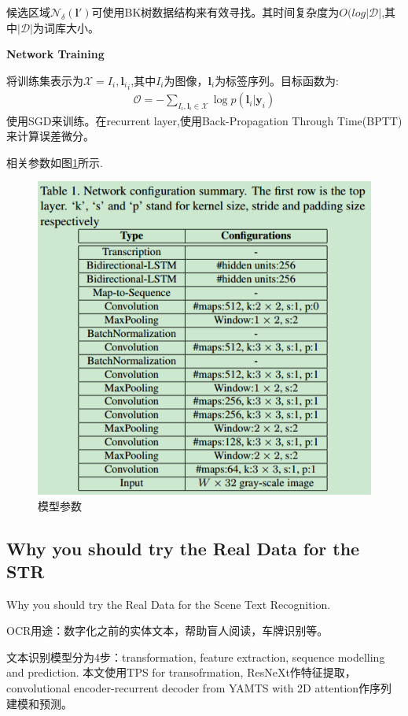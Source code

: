 \documentclass{article}
\begin{document}
候选区域$\mathcal{N}_\delta(\textbf{l}')$可使用BK树数据结构来有效寻找。其时间复杂度为$O(log|\mathcal{D}|$,其中$|\mathcal{D}|$为词库大小。

\textbf{Network Training}

将训练集表示为$\mathcal{X}={I_i,\textbf{l}_i}_i$,其中$I_i$为图像，$\textbf{l}_i$为标签序列。目标函数为:
\begin{align}
\mathcal{O} = - \sum_{I_i,\textbf{l}_i \in \mathcal{X}} \log p(\textbf{l}_i| \textbf{y}_i)
\end{align}
使用SGD来训练。在recurrent layer,使用Back-Propagation Through Time(BPTT)来计算误差微分。

相关参数如图\ref{Fig.crnn_table}所示.
\begin{figure}
\centering
\includegraphics[scale=0.5]{images/CRNN/crnn_table.png}
\caption{模型参数}
\label{Fig.crnn_table}
\end{figure}

\subsection{Why you should try the Real Data for the STR}
Why you should try the Real Data for the Scene Text Recognition.

OCR用途：数字化之前的实体文本，帮助盲人阅读，车牌识别等。

文本识别模型分为4步：transformation, feature extraction, sequence modelling and prediction. 本文使用TPS for transofrmation, ResNeXt作特征提取，convolutional encoder-recurrent decoder from YAMTS with 2D attention作序列建模和预测。
\end{document}
